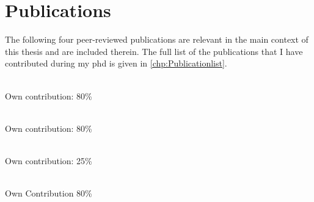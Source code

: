 \noindent
 
\chapter*{Publications}


The following four peer-reviewed publications are relevant in the main context of this thesis and are included therein. The full list of the publications that I have contributed during my phd is given in \autoref{chp:Publicationlist}.\\


\noindent{}\\ \strut \hfill Own contribution: 80\%\\

\noindent{}\\ \strut \hfill Own contribution: 80\%\\

\noindent{}\\ \strut \hfill Own contribution: 25\%\\
\noindent{}\\ \strut \hfill Own Contribution 80\%\\



